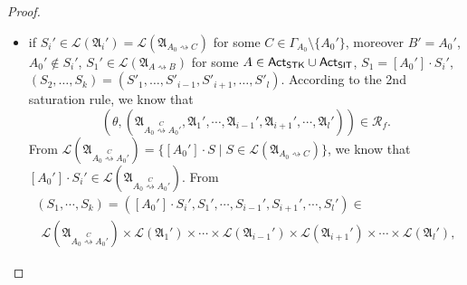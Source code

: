 \documentclass[preprint,12pt]{elsarticle}
\newcommand\Pp{{\mathcal{P} }}
\newcommand\act{{\sf Act}}
\newcommand\post{{\mathsf{post} }}
\newcommand\AutReach{\mathscr{R}}
\newcommand{\STK}{\mathsf{STK}}
\newcommand{\SIT}{\mathsf{SIT}}
\newcommand\Aut{{\mathfrak{A} }}
\newcommand\Lang{{\mathscr{L} }}
\begin{document}
\begin{proof}
{\begin{itemize}
\begin{itemize}
$$\begin{array}{l}
                \ \ \Lang(\Aut_{B'}) \times \Lang(\Aut_1') \times \cdots \times \Lang(\Aut_{i-1}') \times \Lang(\Aut_{i+1}')\times \cdots \times \Lang(\Aut_{l}'),
            \end{array}
            $$  
            we conclude that the claim holds for $n$ in this subcase. 
            \item if $S_i'\in\Lang(\Aut_i') = \Lang(\Aut_{A_0\rightsquigarrow C})$ for some $C\in\Gamma_{A_0}\setminus\{A_0'\}$, moreover $B' = A_0'$, $A_0'\notin S_i'$, $S_1' \in \Lang(\Aut_{A\rightsquigarrow B})$ for some $A\in\act_\STK\cup\act_\SIT$, $S_1 = [A_0']\cdot S_i'$, $(S_2, \dots, S_k) = (S'_1, \dots, S'_{i-1}, S'_{i+1}, \dots, S'_l)$. According to the 2nd saturation rule, we know that 
            $$(\theta, (\Aut_{A_0\stackrel{C}\rightsquigarrow A_0'}, \Aut_1',\cdots, \Aut_{i-1}', \Aut_{i+1}', \cdots, \Aut_{l}')) \in \AutReach_f.$$
            From $\Lang(\Aut_{A_0\stackrel{C}\rightsquigarrow A_0'}) = \{[A_0']\cdot S\mid S \in \Lang(\Aut_{A_0\rightsquigarrow C})\}$, we know that $[A_0']\cdot S_i'\in \Lang(\Aut_{A_0\stackrel{C}\rightsquigarrow A_0'})$. From
            $$
            \begin{array}{l}
                (S_1,\cdots,S_k) = ([A_0']\cdot S_i', S_1', \cdots, S_{i-1}', S_{i+1}', \cdots, S_l') \in \\
                \ \ \Lang(\Aut_{A_0\stackrel{C}\rightsquigarrow A_0'}) \times \Lang(\Aut_1') \times \cdots \times \Lang(\Aut_{i-1}') \times \Lang(\Aut_{i+1}')\times \cdots \times \Lang(\Aut_{l}'),

\end{array}$$
\end{itemize}
\end{itemize}}
\end{proof}
\end{document}
